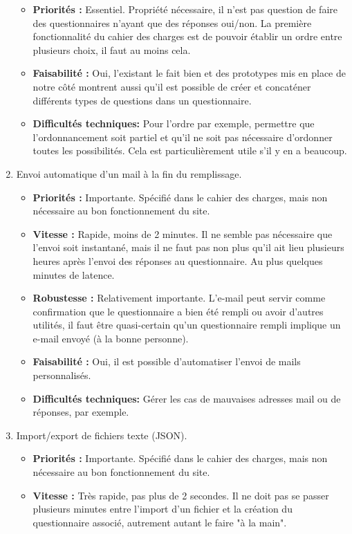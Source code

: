 \documentclass{article}
\begin{document}
\begin{enumerate}[noitemsep]
\begin{itemize}[noitemsep]
    \item \textbf{Priorités : }Essentiel. Propriété nécessaire, il n'est pas question de faire des questionnaires n'ayant que des réponses oui/non. La première fonctionnalité du cahier des charges est de pouvoir établir un ordre entre plusieurs choix, il faut au moins cela.
    \item \textbf{Faisabilité : }Oui, l'existant le fait bien et des prototypes mis en place de notre côté montrent aussi qu'il est possible de créer et concaténer différents types de questions dans un questionnaire.
    \item \textbf{Difficultés techniques: }Pour l'ordre par exemple, permettre que l'ordonnancement soit partiel et qu'il ne soit pas nécessaire d'ordonner toutes les possibilités. Cela est particulièrement utile s'il y en a beaucoup.
\end{itemize}
\item Envoi automatique d'un mail à la fin du remplissage.
\begin{itemize}[noitemsep]
    \item \textbf{Priorités : }Importante. Spécifié dans le cahier des charges, mais non nécessaire au bon fonctionnement du site.
    \item \textbf{Vitesse : }Rapide, moins de 2 minutes. Il ne semble pas nécessaire que l'envoi soit instantané, mais il ne faut pas non plus qu'il ait lieu plusieurs heures après l'envoi des réponses au questionnaire. Au plus quelques minutes de latence.
    \item \textbf{Robustesse : }Relativement importante. L'e-mail peut servir comme confirmation que le questionnaire a bien été rempli ou avoir d'autres utilités, il faut être quasi-certain qu'un questionnaire rempli implique un e-mail envoyé (à la bonne personne).
    \item \textbf{Faisabilité : }Oui, il est possible d'automatiser l'envoi de mails personnalisés.
    \item \textbf{Difficultés techniques: } Gérer les cas de mauvaises adresses mail ou de réponses, par exemple.
\end{itemize}
\newpage
\item Import/export de fichiers texte (JSON).
\begin{itemize}[noitemsep]
    \item \textbf{Priorités : }Importante. Spécifié dans le cahier des charges, mais non nécessaire au bon fonctionnement du site.
    \item \textbf{Vitesse : }Très rapide, pas plus de 2 secondes. Il ne doit pas se passer plusieurs minutes entre l'import d'un fichier et la création du questionnaire associé, autrement autant le faire "à la main".

\end{itemize}
\end{enumerate}
\end{document}
